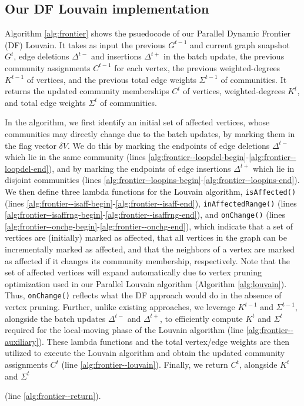 





\subsection{Our DF Louvain implementation}
\label{sec:our-frontier}

Algorithm \ref{alg:frontier} shows the psuedocode of our Parallel Dynamic Frontier (DF) Louvain. It takes as input the previous $G^{t-1}$ and current graph snapshot $G^t$, edge deletions $\Delta^{t-}$ and insertions $\Delta^{t+}$ in the batch update, the previous community assignments $C^{t-1}$ for each vertex, the previous weighted-degrees $K^{t-1}$ of vertices, and the previous total edge weights $\Sigma^{t-1}$ of communities. It returns the updated community memberships $C^t$ of vertices, weighted-degrees $K^t$, and total edge weights $\Sigma^t$ of communities.



In the algorithm, we first identify an initial set of affected vertices, whose communities may directly change due to the batch updates, by marking them in the flag vector $\delta V$. We do this by marking the endpoints of edge deletions $\Delta^{t-}$ which lie in the same community (lines \ref{alg:frontier--loopdel-begin}-\ref{alg:frontier--loopdel-end}), and by marking the endpoints of edge insertions $\Delta^{t+}$ which lie in disjoint communities (lines \ref{alg:frontier--loopins-begin}-\ref{alg:frontier--loopins-end}). We then define three lambda functions for the Louvain algorithm, \texttt{isAffected()} (lines \ref{alg:frontier--isaff-begin}-\ref{alg:frontier--isaff-end}), \texttt{inAffectedRange()} (lines \ref{alg:frontier--isaffrng-begin}-\ref{alg:frontier--isaffrng-end}), and \texttt{onChange()} (lines \ref{alg:frontier--onchg-begin}-\ref{alg:frontier--onchg-end}), which indicate that a set of vertices are (initially) marked as affected, that all vertices in the graph can be incrementally marked as affected, and that the neighbors of a vertex are marked as affected if it changes its community membership, respectively. Note that the set of affected vertices will expand automatically due to vertex pruning optimization used in our Parallel Louvain algorithm (Algorithm \ref{alg:louvain}). Thus, \texttt{onChange()} reflects what the DF approach would do in the absence of vertex pruning. Further, unlike existing approaches, we leverage $K^{t-1}$ and $\Sigma^{t-1}$, alongside the batch updates $\Delta^{t-}$ and $\Delta^{t+}$, to efficiently compute $K^t$ and $\Sigma^t$ required for the local-moving phase of the Louvain algorithm (line \ref{alg:frontier--auxiliary}). These lambda functions and the total vertex/edge weights are then utilized to execute the Louvain algorithm and obtain the updated community assignments $C^t$ (line \ref{alg:frontier--louvain}). Finally, we return $C^t$, alongside $K^t$ and $\Sigma^t$ (line \ref{alg:frontier--return}).




